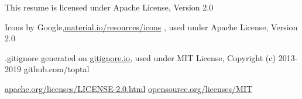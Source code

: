 \hspace{1pt}

\footnotesize{

	
This resume is licensed under Apache License, Version 2.0

Icons by Google,{\secondaryColor\href{https://material.io/resources/icons}{material.io/resources/icons} }, used under Apache License, Version 2.0

.gitignore generated on {\secondaryColor\href{https://gitignore.io}{gitignore.io}}, used under MIT License, Copyright (c) 2013-2019 github.com/toptal

\secondaryColor\href{https://www.apache.org/licenses/LICENSE-2.0.html}{apache.org/licenses/LICENSE-2.0.html}   \hspace{1pc} \secondaryColor\href{https://opensource.org/licenses/MIT}{opensource.org/licenses/MIT}


}